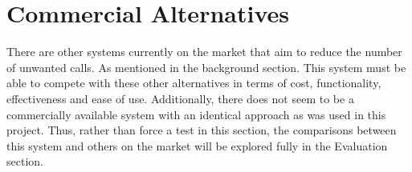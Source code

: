 \documentclass[main.tex]{subfiles}
\begin{document}
\section{Commercial Alternatives}
There are other systems currently on the market that aim to reduce the number of unwanted calls. As mentioned in the background section. This system must be able to compete with these other alternatives in terms of cost, functionality, effectiveness and ease of use. Additionally, there does not seem to be a commercially available system with an identical approach as was used in this project. Thus, rather than force a test in this section, the comparisons between this system and others on the market will be explored fully in the Evaluation section.
\end{document}
